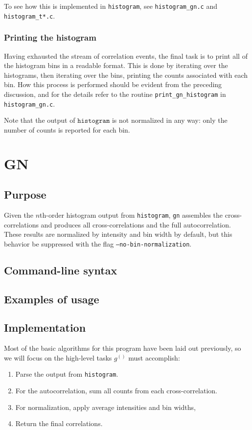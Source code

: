 \documentclass{article}
\newcommand{\histogram}{\texttt{histogram}}
\newcommand{\gn}[1]{\ensuremath{g^{(#1)}}}
\newcommand{\GN}{\texttt{gn}}
\begin{document}
To see how this is implemented in \histogram, see \texttt{histogram\_gn.c} and \texttt{histogram\_t*.c}. 

\subsubsection{Printing the histogram}
Having exhausted the stream of correlation events, the final task is to print all of the histogram bins in a readable format. This is done by iterating over the histograms, then iterating over the bins, printing the counts associated with each bin. How this process is performed should be evident from the preceding discussion, and for the details refer to the routine \texttt{print\_gn\_histogram} in \texttt{histogram\_gn.c}.

Note that the output of $\histogram$ is not normalized in any way: only the number of counts is reported for each bin.

\section{GN}
\subsection{Purpose}
Given the $n$th-order histogram output from \histogram, \GN{} assembles the cross-correlations and produces all cross-correlations and the full autocorrelation. These results are normalized by intensity and bin width by default, but this behavior be suppressed with the flag \texttt{--no-bin-normalization}.

\subsection{Command-line syntax}

\subsection{Examples of usage}

\subsection{Implementation}
Most of the basic algorithms for this program have been laid out previously, so we will focus on the high-level tasks \gn{} must accomplish:
\begin{enumerate}
\item Parse the output from \histogram.
\item For the autocorrelation, sum all counts from each cross-correlation.
\item For normalization, apply average intensities and bin widths,
\item Return the final correlations.
\end{enumerate}
\end{document}
